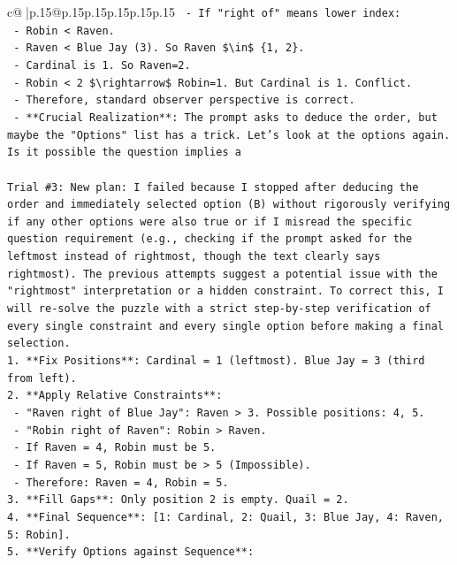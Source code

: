 \documentclass{article}
\begin{document}
{\begin{supertabular}{c@{$\;$}|p{.15\linewidth}@{}p{.15\linewidth}p{.15\linewidth}p{.15\linewidth}p{.15\linewidth}p{.15\linewidth}}
{{{\texttt{   {-} If "right of" means lower index:} \\
\texttt{     {-} Robin < Raven.} \\
\texttt{     {-} Raven < Blue Jay (3). So Raven \$\textbackslash{}in\$ \{1, 2\}.} \\
\texttt{     {-} Cardinal is 1. So Raven=2.} \\
\texttt{     {-} Robin < 2 \$\textbackslash{}rightarrow\$ Robin=1. But Cardinal is 1. Conflict.} \\
\texttt{   {-} Therefore, standard observer perspective is correct.} \\
\texttt{   {-} **Crucial Realization**: The prompt asks to deduce the order, but maybe the "Options" list has a trick. Let's look at the options again. Is it possible the question implies a} \\
\\ 
\texttt{Trial \#3: New plan: I failed because I stopped after deducing the order and immediately selected option (B) without rigorously verifying if any other options were also true or if I misread the specific question requirement (e.g., checking if the prompt asked for the leftmost instead of rightmost, though the text clearly says rightmost). The previous attempts suggest a potential issue with the "rightmost" interpretation or a hidden constraint. To correct this, I will re{-}solve the puzzle with a strict step{-}by{-}step verification of every single constraint and every single option before making a final selection.} \\
\texttt{1. **Fix Positions**: Cardinal = 1 (leftmost). Blue Jay = 3 (third from left).} \\
\texttt{2. **Apply Relative Constraints**:} \\
\texttt{   {-} "Raven right of Blue Jay": Raven > 3. Possible positions: 4, 5.} \\
\texttt{   {-} "Robin right of Raven": Robin > Raven.} \\
\texttt{   {-} If Raven = 4, Robin must be 5.} \\
\texttt{   {-} If Raven = 5, Robin must be > 5 (Impossible).} \\
\texttt{   {-} Therefore: Raven = 4, Robin = 5.} \\
\texttt{3. **Fill Gaps**: Only position 2 is empty. Quail = 2.} \\
\texttt{4. **Final Sequence**: {[}1: Cardinal, 2: Quail, 3: Blue Jay, 4: Raven, 5: Robin{]}.} \\
\texttt{5. **Verify Options against Sequence**:} \\
}}}
\end{supertabular}}
\end{document}
